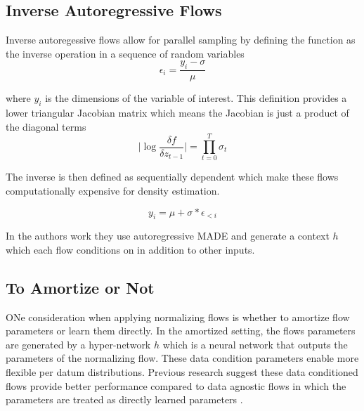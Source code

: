 

\subsection{Inverse Autoregressive Flows}

Inverse autoregessive flows allow for parallel sampling by defining the function as the inverse operation in a sequence of random variables \citet{kingma2016IAF}
\begin{equation}
\epsilon_{i} = \frac{y_{i} - \sigma}{\mu}
\end{equation}

where $y_{i}$ is the dimensions of the variable of interest. This definition provides a lower triangular Jacobian matrix which means the Jacobian is just a product of the diagonal terms
\begin{equation}
\bigg| \log \frac{\delta f}{\delta z_{t -1 } } \bigg| = \prod_{t=0}^{T} \sigma_{t}
\end{equation}

The inverse is then defined as sequentially dependent which make these flows computationally expensive for density estimation. 

\begin{equation}
y_{i} = \mu + \sigma * \epsilon_{<i}
\end{equation}

In the authors work they use autoregressive MADE \cite{gregor2015MADE} and generate a context $h$ which each flow conditions on in addition to other inputs. 


\subsection{To Amortize or Not}

ONe consideration when applying normalizing flows is whether to amortize flow parameters or learn them directly. In the amortized setting, the flows parameters are generated by a hyper-network $h$ \cite{ha2016hypernets} which is a neural network that outputs the parameters of the normalizing flow. These data condition parameters enable more flexible per datum distributions. Previous research suggest these data conditioned flows provide better performance compared to data agnostic flows in which the parameters are treated as directly learned parameters \cite{vdberg2018sylvester}.

